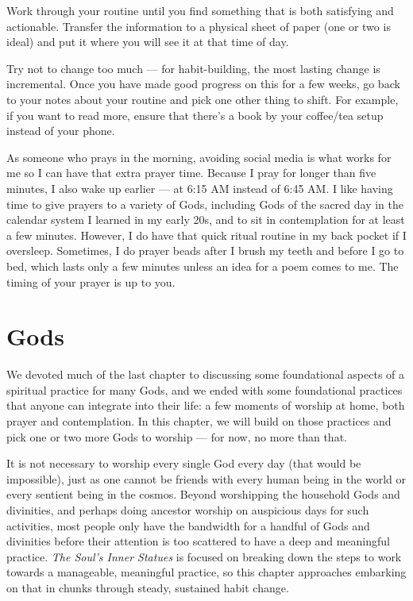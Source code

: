 \documentclass[
]{book}
\begin{document}
Work through your routine until you find something that is both satisfying and actionable. Transfer the information to a physical sheet of paper (one or two is ideal) and put it where you will see it at that time of day.

Try not to change too much --- for habit-building, the most lasting change is incremental. Once you have made good progress on this for a few weeks, go back to your notes about your routine and pick one other thing to shift. For example, if you want to read more, ensure that there's a book by your coffee/tea setup instead of your phone.

As someone who prays in the morning, avoiding social media is what works for me so I can have that extra prayer time. Because I pray for longer than five minutes, I also wake up earlier --- at 6:15 AM instead of 6:45 AM. I like having time to give prayers to a variety of Gods, including Gods of the sacred day in the calendar system I learned in my early 20s, and to sit in contemplation for at least a few minutes. However, I do have that quick ritual routine in my back pocket if I oversleep. Sometimes, I do prayer beads after I brush my teeth and before I go to bed, which lasts only a few minutes unless an idea for a poem comes to me. The timing of your prayer is up to you.

\hypertarget{gods}{%
\chapter{Gods}\label{gods}}

We devoted much of the last chapter to discussing some foundational aspects of a spiritual practice for many Gods, and we ended with some foundational practices that anyone can integrate into their life: a few moments of worship at home, both prayer and contemplation. In this chapter, we will build on those practices and pick one or two more Gods to worship --- for now, no more than that.

It is not necessary to worship every single God every day (that would be impossible), just as one cannot be friends with every human being in the world or every sentient being in the cosmos. Beyond worshipping the household Gods and divinities, and perhaps doing ancestor worship on auspicious days for such activities, most people only have the bandwidth for a handful of Gods and divinities before their attention is too scattered to have a deep and meaningful practice. \emph{The Soul's Inner Statues} is focused on breaking down the steps to work towards a manageable, meaningful practice, so this chapter approaches embarking on that in chunks through steady, sustained habit change.
\end{document}
